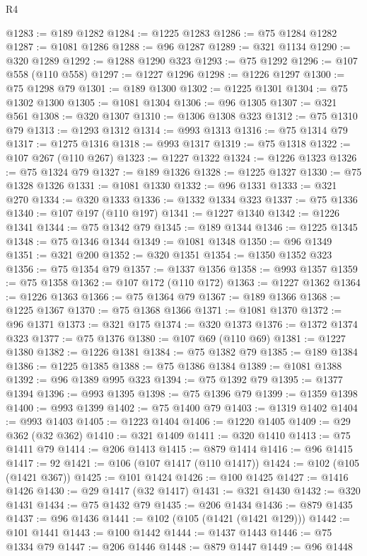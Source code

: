 \begin{lexlean}{R4}
\begin{coremodule}
{{{{{{{{{{{{{{{{{{{{{{{{{{{{{{{{{{{{{{{{{{{{{{{{{{{{{{{{{{{{{{{{{{{{{{{{{{{{{{{{{{{{{{{{{{{{@1283 := @189 @1282
@1284 := @1225 @1283
@1286 := @75 @1284 @1282
@1287 := @1081 @1286
@1288 := @96 @1287
@1289 := @321 @1134
@1290 := @320 @1289
@1292 := @1288 @1290 @323
@1293 := @75 @1292
@1296 := @107 @558 (@110 @558)
@1297 := @1227 @1296
@1298 := @1226 @1297
@1300 := @75 @1298 @79
@1301 := @189 @1300
@1302 := @1225 @1301
@1304 := @75 @1302 @1300
@1305 := @1081 @1304
@1306 := @96 @1305
@1307 := @321 @561
@1308 := @320 @1307
@1310 := @1306 @1308 @323
@1312 := @75 @1310 @79
@1313 := @1293 @1312
@1314 := @993 @1313
@1316 := @75 @1314 @79
@1317 := @1275 @1316
@1318 := @993 @1317
@1319 := @75 @1318
@1322 := @107 @267 (@110 @267)
@1323 := @1227 @1322
@1324 := @1226 @1323
@1326 := @75 @1324 @79
@1327 := @189 @1326
@1328 := @1225 @1327
@1330 := @75 @1328 @1326
@1331 := @1081 @1330
@1332 := @96 @1331
@1333 := @321 @270
@1334 := @320 @1333
@1336 := @1332 @1334 @323
@1337 := @75 @1336
@1340 := @107 @197 (@110 @197)
@1341 := @1227 @1340
@1342 := @1226 @1341
@1344 := @75 @1342 @79
@1345 := @189 @1344
@1346 := @1225 @1345
@1348 := @75 @1346 @1344
@1349 := @1081 @1348
@1350 := @96 @1349
@1351 := @321 @200
@1352 := @320 @1351
@1354 := @1350 @1352 @323
@1356 := @75 @1354 @79
@1357 := @1337 @1356
@1358 := @993 @1357
@1359 := @75 @1358
@1362 := @107 @172 (@110 @172)
@1363 := @1227 @1362
@1364 := @1226 @1363
@1366 := @75 @1364 @79
@1367 := @189 @1366
@1368 := @1225 @1367
@1370 := @75 @1368 @1366
@1371 := @1081 @1370
@1372 := @96 @1371
@1373 := @321 @175
@1374 := @320 @1373
@1376 := @1372 @1374 @323
@1377 := @75 @1376
@1380 := @107 @69 (@110 @69)
@1381 := @1227 @1380
@1382 := @1226 @1381
@1384 := @75 @1382 @79
@1385 := @189 @1384
@1386 := @1225 @1385
@1388 := @75 @1386 @1384
@1389 := @1081 @1388
@1392 := @96 @1389 @995 @323
@1394 := @75 @1392 @79
@1395 := @1377 @1394
@1396 := @993 @1395
@1398 := @75 @1396 @79
@1399 := @1359 @1398
@1400 := @993 @1399
@1402 := @75 @1400 @79
@1403 := @1319 @1402
@1404 := @993 @1403
@1405 := @1223 @1404
@1406 := @1220 @1405
@1409 := @29 @362 (@32 @362)
@1410 := @321 @1409
@1411 := @320 @1410
@1413 := @75 @1411 @79
@1414 := @206 @1413
@1415 := @879 @1414
@1416 := @96 @1415
@1417 := 92
@1421 := @106 (@107 @1417 (@110 @1417))
@1424 := @102 (@105 (@1421 @367))
@1425 := @101 @1424
@1426 := @100 @1425
@1427 := @1416 @1426
@1430 := @29 @1417 (@32 @1417)
@1431 := @321 @1430
@1432 := @320 @1431
@1434 := @75 @1432 @79
@1435 := @206 @1434
@1436 := @879 @1435
@1437 := @96 @1436
@1441 := @102 (@105 (@1421 (@1421 @129)))
@1442 := @101 @1441
@1443 := @100 @1442
@1444 := @1437 @1443
@1446 := @75 @1334 @79
@1447 := @206 @1446
@1448 := @879 @1447
@1449 := @96 @1448
}}}}}}}}}}}}}}}}}}}}}}}}}}}}}}}}}}}}}}}}}}}}}}}}}}}}}}}}}}}}}}}}}}}}}}}}}}}}}}}}}}}}}}}}}}}}
\end{coremodule}
\end{lexlean}
